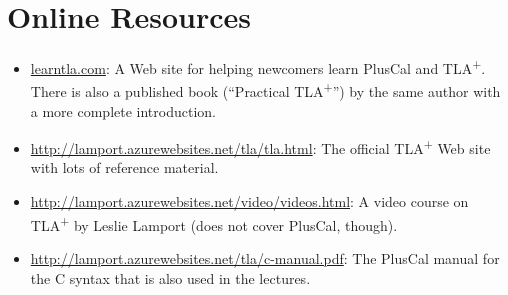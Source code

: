 \documentclass[11pt,fleqn]{article}
\newcommand{\tlaplus}{TLA\textsuperscript{+}\xspace}
\begin{document}
\section{Online Resources}

\begin{itemize}
\item \url{learntla.com}: A Web site for helping newcomers learn PlusCal and
  \tlaplus. There is also a published book (``Practical \tlaplus'') by the same
  author with a more complete introduction.
\item \url{http://lamport.azurewebsites.net/tla/tla.html}: The official \tlaplus
  Web site with lots of reference material.
\item \url{http://lamport.azurewebsites.net/video/videos.html}: A video course
  on \tlaplus by Leslie Lamport (does not cover PlusCal, though).
\item \url{http://lamport.azurewebsites.net/tla/c-manual.pdf}: The PlusCal
  manual for the C syntax that is also used in the lectures.
\end{itemize}
\end{document}
